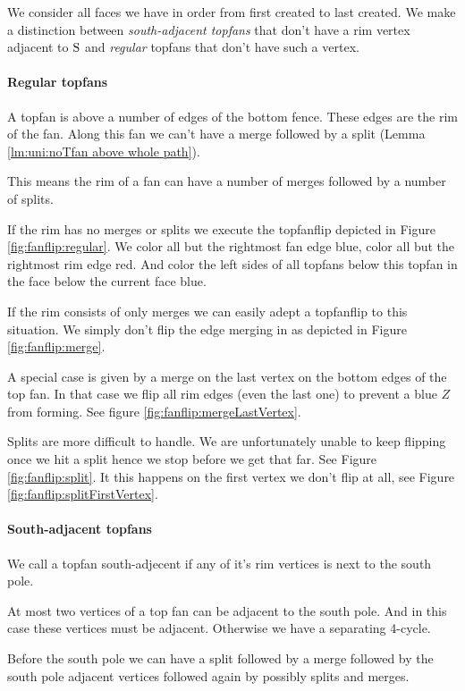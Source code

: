 We consider all faces we have in order from first created to last created. We make a distinction between \emph{south-adjacent topfans} that don't have a rim vertex adjacent to $\mathrm{S}$ and \emph{regular} topfans that don't have such a vertex.

\paragraph{Regular topfans}
A topfan is above a number of edges of the bottom fence. These edges are the rim of the fan.  Along this fan we can't have a merge followed by a split (Lemma \ref{lm:uni:noTfan above whole path}).

This means the rim of a fan can have a number of merges followed by a number of splits.

If the rim has no merges or splits we execute the topfanflip depicted in Figure \ref{fig:fanflip:regular}. We color all but the rightmost fan edge blue, color all but the rightmost rim edge red. And color the left sides of all topfans below this topfan in the face below the current face blue.

If the rim consists of only merges we can easily adept a topfanflip to this situation. We simply don't flip the edge merging in as depicted in Figure \ref{fig:fanflip:merge}.

A special case is given by a merge on the last vertex on the bottom edges of the top fan. In that case we flip all rim edges (even the last one) to prevent a blue $Z$ from forming. See figure \ref{fig:fanflip:mergeLastVertex}.

Splits are more difficult to handle. We are unfortunately unable to keep flipping once we hit a split hence we stop before we get that far. See Figure \ref{fig:fanflip:split}. It this happens on the first vertex we don't flip at all, see Figure \ref{fig:fanflip:splitFirstVertex}.

\paragraph{South-adjacent topfans}
We call a topfan south-adjecent if any of it's rim vertices is next to the south pole.

At most two vertices of a top fan can be adjacent to the south pole. And in this case these vertices must be adjacent. Otherwise we have a separating 4-cycle.

Before the south pole we can have a split followed by a merge followed by the south pole adjacent vertices followed again by possibly splits and merges.

